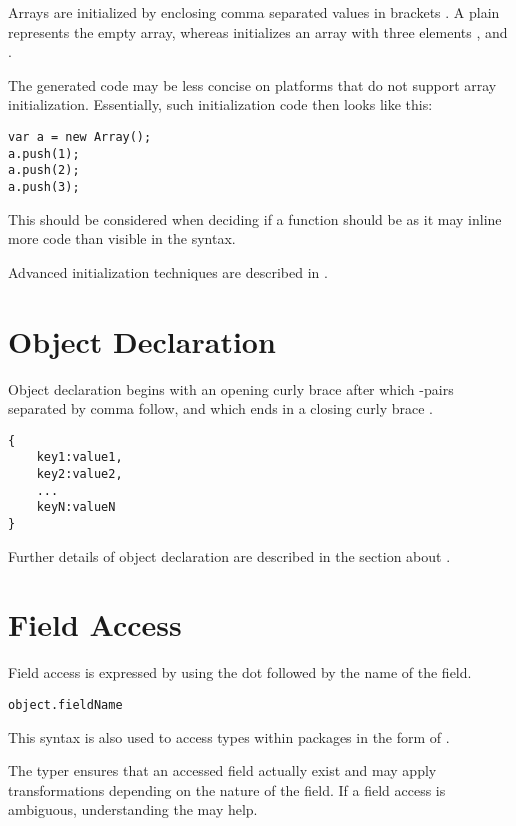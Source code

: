 Arrays are initialized by enclosing comma \expr{,} separated values in brackets \expr{[]}. A plain \expr{[]} represents the empty array, whereas \expr{[1, 2, 3]} initializes an array with three elements ,  and .

The generated code may be less concise on platforms that do not support array initialization. Essentially, such initialization code then looks like this:

\begin{lstlisting}
var a = new Array();
a.push(1);
a.push(2);
a.push(3);
\end{lstlisting}
This should be considered when deciding if a function should be  as it may inline more code than visible in the syntax.

Advanced initialization techniques are described in .


\section{Object Declaration}
\label{expression-object-declaration}

Object declaration begins with an opening curly brace \expr{\{} after which -pairs separated by comma \expr{,} follow, and which ends in a closing curly brace \expr{\}}.

\begin{lstlisting}
{
	key1:value1,
	key2:value2,
	...
	keyN:valueN
}
\end{lstlisting}
Further details of object declaration are described in the section about .


\section{Field Access}
\label{expression-field-access}

Field access is expressed by using the dot  followed by the name of the field.

\begin{lstlisting}
object.fieldName
\end{lstlisting}

This syntax is also used to access types within packages in the form of .

The typer ensures that an accessed field actually exist and may apply transformations depending on the nature of the field. If a field access is ambiguous, understanding the  may help.


